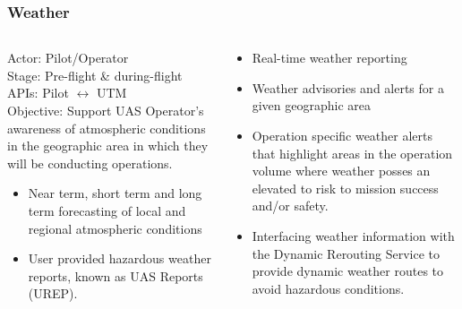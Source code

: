 \documentclass[usenames,dvipsnames,aspectratio=169,serif]{beamer}
\begin{document}
\begin{frame}
   \frametitle{Weather}
   \begin{columns}[t]
      \begin{column}{0.5\textwidth}
         Actor: Pilot/Operator \\
         Stage: Pre-flight \& during-flight \\
         APIs: Pilot $\leftrightarrow$ UTM \\
         Objective: Support UAS Operator's awareness of atmospheric conditions in the geographic area in which they will be conducting operations.
         \begin{itemize}\small
         \item  Near term, short term and long term forecasting of local and regional atmospheric conditions
         \item  User provided hazardous weather reports, known as UAS Reports (UREP).
         \end{itemize}
      \end{column}
      \begin{column}{0.5\textwidth}
         \begin{itemize}\small
         \item  Real-time weather reporting
         \item  Weather advisories and alerts for a given geographic area
         \item  Operation specific weather alerts that highlight areas in the operation volume where weather posses an elevated to risk to mission success and/or safety.
         \item  Interfacing weather information with the Dynamic Rerouting Service to provide dynamic weather routes to avoid hazardous conditions.
         \end{itemize}
      \end{column}
   \end{columns}
\end{frame}
\end{document}
